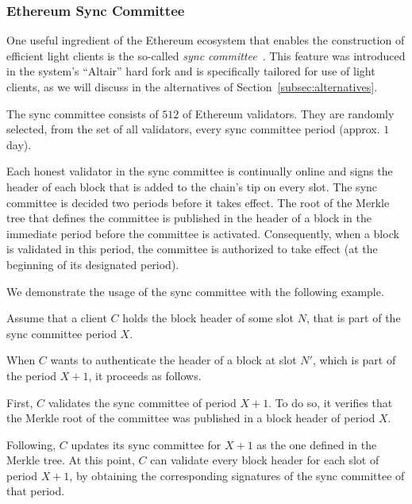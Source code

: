 

\subsubsection{Ethereum Sync Committee}\label{subsec:sync-committee}

One useful ingredient of the Ethereum ecosystem that enables the
construction of efficient light clients is the so-called \emph{sync committee}~\cite{sync-committee}.
This feature was introduced in the system's
``Altair'' hard fork and is specifically tailored for use of light clients, as
we will discuss in the alternatives of Section~\ref{subsec:alternatives}.

The sync committee consists of $512$ of Ethereum validators. They are randomly
selected, from the set of all validators, every sync committee period (approx.
$1$ day).

Each honest validator in the sync committee is continually online and signs the
header of each block that is added to the chain's tip on every slot. The sync
committee is decided two periods before it takes effect. The root of the Merkle
tree that defines the committee is published in the header of a block in the
immediate period before the committee is activated. Consequently, when a block
is validated in this period, the committee is authorized to take effect (at the
beginning of its designated period).

We demonstrate the usage of the sync committee with the following example.

Assume that a client $C$ holds the block header of some slot $N$, that is part
of the sync committee period $X$.

When $C$ wants to authenticate the header of a block at slot $N'$, which is
part of the period $X+1$, it proceeds as follows.

First, $C$ validates the sync committee of period $X+1$. To do so, it verifies
that the Merkle root of the committee was published in a block header of period
$X$.

Following, $C$ updates its sync committee for $X+1$ as the one defined in the
Merkle tree. At this point, $C$ can validate every block header for each slot
of period $X+1$, by obtaining the corresponding signatures of the sync
committee of that period.

